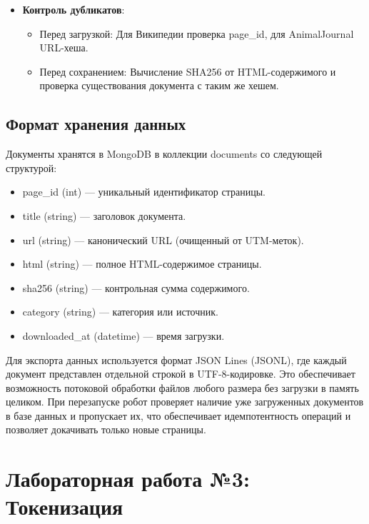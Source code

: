 \documentclass[a4paper,12pt]{article}
\begin{document}
\begin{itemize}
\begin{itemize}
            \item Загрузка каждой HTML страницы статьи.
            \item Сохранение в MongoDB
    \end{itemize}
    \item \textbf{Контроль дубликатов}:
    \begin{itemize}
            \item Перед загрузкой: Для Википедии проверка page\_id, для AnimalJournal URL-хеша.
            \item Перед сохранением: Вычисление SHA256 от HTML-содержимого и проверка существования документа с таким же хешем.
    \end{itemize}
\end{itemize}

\subsection{Формат хранения данных}
Документы хранятся в MongoDB в коллекции documents со следующей структурой:
\begin{itemize}
    \item page\_id (int) — уникальный идентификатор страницы.
    \item title (string) — заголовок документа.
    \item url (string) — канонический URL (очищенный от UTM-меток).
    \item html (string) — полное HTML-содержимое страницы.
    \item sha256 (string) — контрольная сумма содержимого.
    \item category (string) — категория или источник.
    \item downloaded\_at (datetime) — время загрузки.
\end{itemize}
Для экспорта данных используется формат JSON Lines (JSONL), где каждый документ представлен отдельной строкой в UTF-8-кодировке. Это обеспечивает возможность потоковой обработки файлов любого размера без загрузки в память целиком.
При перезапуске робот проверяет наличие уже загруженных документов в базе данных и пропускает их, что обеспечивает идемпотентность операций и позволяет докачивать только новые страницы.

\section{Лабораторная работа №3: Токенизация}
\end{document}
